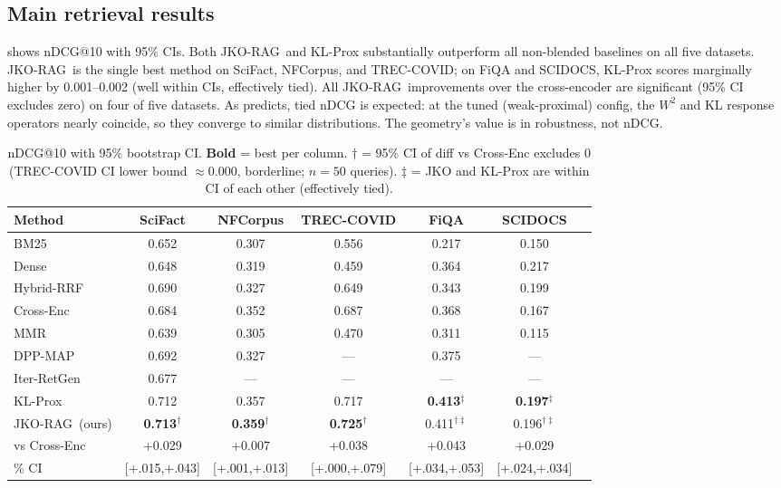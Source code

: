 \documentclass{article}
\theoremstyle{plain}
\newcommand{\jko}{\textsc{JKO-RAG}}
\begin{document}
\subsection{Main retrieval results}

 shows nDCG@10 with 95\% CIs. Both \jko\ and KL-Prox substantially outperform all non-blended baselines on all five datasets. \jko\ is the single best method on SciFact, NFCorpus, and TREC-COVID; on FiQA and SCIDOCS, KL-Prox scores marginally higher by 0.001--0.002 (well within CIs, effectively tied). All \jko\ improvements over the cross-encoder are significant (95\% CI excludes zero) on four of five datasets. As  predicts, tied nDCG is expected: at the tuned (weak-proximal) config, the $W^2$ and KL response operators nearly coincide, so they converge to similar distributions. The geometry's value is in robustness, not nDCG.

\begin{table}[t]
\centering\small
\caption{nDCG@10 with 95\% bootstrap CI. \textbf{Bold} = best per column. $\dagger$ = 95\% CI of diff vs Cross-Enc excludes 0 (TREC-COVID CI lower bound ${\approx}0.000$, borderline; $n{=}50$ queries). $\ddagger$ = JKO and KL-Prox are within CI of each other (effectively tied).}
\label{tab:main}
\setlength\tabcolsep{4pt}
\begin{tabular}{@{}lcccccc@{}}
\toprule
Method & SciFact & NFCorpus & TREC-COVID & FiQA & SCIDOCS \\
\midrule
BM25        & 0.652 & 0.307 & 0.556 & 0.217 & 0.150 \\
Dense       & 0.648 & 0.319 & 0.459 & 0.364 & 0.217 \\
Hybrid-RRF  & 0.690 & 0.327 & 0.649 & 0.343 & 0.199 \\
Cross-Enc   & 0.684 & 0.352 & 0.687 & 0.368 & 0.167 \\
MMR         & 0.639 & 0.305 & 0.470 & 0.311 & 0.115 \\
DPP-MAP     & 0.692 & 0.327 & ---   & 0.375 & ---   \\
Iter-RetGen & 0.677 & ---   & ---   & ---   & ---   \\
KL-Prox     & 0.712 & 0.357 & 0.717 & \textbf{0.413}$^\ddagger$ & \textbf{0.197}$^\ddagger$ \\
\midrule
\jko\ (ours)  & \textbf{0.713}$^\dagger$ & \textbf{0.359}$^\dagger$ & \textbf{0.725}$^\dagger$ & 0.411$^{\dagger\ddagger}$ & 0.196$^{\dagger\ddagger}$ \\
\quad vs Cross-Enc & +0.029 & +0.007 & +0.038 & +0.043 & +0.029 \\
\quad 95\% CI  & [\!+.015,+.043\!] & [\!+.001,+.013\!] & [\!+.000,+.079\!] & [\!+.034,+.053\!] & [\!+.024,+.034\!] \\
\bottomrule
\end{tabular}
\end{table}
\end{document}
